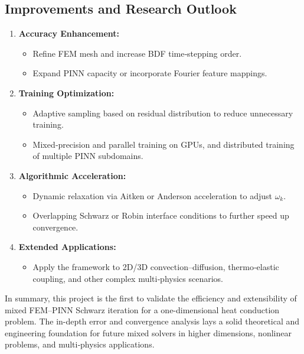 \documentclass[12pt]{article}
\begin{document}
\subsection{Improvements and Research Outlook}

\begin{enumerate}
  \item \textbf{Accuracy Enhancement:}
  \begin{itemize}
    \item Refine FEM mesh and increase BDF time‐stepping order.
    \item Expand PINN capacity or incorporate Fourier feature mappings\cite{sitzmann_implicit_2020}.
  \end{itemize}
  \item \textbf{Training Optimization:}
  \begin{itemize}
    \item Adaptive sampling based on residual distribution to reduce unnecessary training\cite{chen_physics-informed_2021}.
    \item Mixed‐precision and parallel training on GPUs, and distributed training of multiple PINN subdomains.
  \end{itemize}
  \item \textbf{Algorithmic Acceleration:}
  \begin{itemize}
    \item Dynamic relaxation via Aitken or Anderson acceleration to adjust \(\omega_k\).
    \item Overlapping Schwarz or Robin interface conditions to further speed up convergence\cite{quarteroni_domain_1999}.
  \end{itemize}
  \item \textbf{Extended Applications:}
  \begin{itemize}
    \item Apply the framework to 2D/3D convection–diffusion, thermo‐elastic coupling, and other complex multi‐physics scenarios.
  \end{itemize}
\end{enumerate}

In summary, this project is the first to validate the efficiency and extensibility of mixed FEM–PINN Schwarz iteration for a one-dimensional heat conduction problem. The in-depth error and convergence analysis lays a solid theoretical and engineering foundation for future mixed solvers in higher dimensions, nonlinear problems, and multi‐physics applications.



\end{document}
